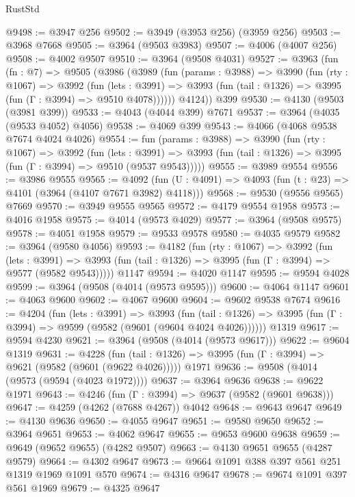 \begin{lexlean}{RustStd}
\begin{coremodule}
@9498 := @3947 @256
@9502 := @3949 (@3953 @256) (@3959 @256)
@9503 := @3968 @7668
@9505 := @3964 (@9503 @3983)
@9507 := @4006 (@4007 @256)
@9508 := @4002 @9507
@9510 := @3964 (@9508 @4031)
@9527 := @3963
    (fun (fn : @7) =>
    @9505
      (@3986
        (@3989
          (fun (params : @3988) =>
          @3990
            (fun (rty : @1067) =>
            @3992
              (fun (lets : @3991) =>
              @3993 (fun (tail : @1326) => @3995 (fun (Γ : @3994) => @9510 @4078))))))
        @4124))
    @399
@9530 := @4130 (@9503 (@3981 @399))
@9533 := @4043 (@4044 @399) @7671
@9537 := @3964 (@4035 (@9533 @4052) @4056)
@9538 := @4069 @399
@9543 := @4066 (@4068 @9538 @7674 @4024 @4026)
@9554 := fun (params : @3988) =>
  @3990
    (fun (rty : @1067) =>
    @3992
      (fun (lets : @3991) =>
      @3993 (fun (tail : @1326) => @3995 (fun (Γ : @3994) => @9510 (@9537 @9543)))))
@9555 := @3989 @9554
@9556 := @3986 @9555
@9565 := @4092 (fun (U : @4091) => @4093 (fun (t : @23) => @4101 (@3964 (@4107 @7671 @3982) @4118)))
@9568 := @9530 (@9556 @9565) @7669
@9570 := @3949 @9555 @9565
@9572 := @4179 @9554 @1958
@9573 := @4016 @1958
@9575 := @4014 (@9573 @4029)
@9577 := @3964 (@9508 @9575)
@9578 := @4051 @1958
@9579 := @9533 @9578
@9580 := @4035 @9579
@9582 := @3964 (@9580 @4056)
@9593 := @4182
    (fun (rty : @1067) =>
    @3992
      (fun (lets : @3991) =>
      @3993 (fun (tail : @1326) => @3995 (fun (Γ : @3994) => @9577 (@9582 @9543)))))
    @1147
@9594 := @4020 @1147
@9595 := @9594 @4028
@9599 := @3964 (@9508 (@4014 (@9573 @9595)))
@9600 := @4064 @1147
@9601 := @4063 @9600
@9602 := @4067 @9600
@9604 := @9602 @9538 @7674
@9616 := @4204
    (fun (lets : @3991) =>
    @3993
      (fun (tail : @1326) => @3995 (fun (Γ : @3994) => @9599 (@9582 (@9601 (@9604 @4024 @4026))))))
    @1319
@9617 := @9594 @4230
@9621 := @3964 (@9508 (@4014 (@9573 @9617)))
@9622 := @9604 @1319
@9631 := @4228
    (fun (tail : @1326) => @3995 (fun (Γ : @3994) => @9621 (@9582 (@9601 (@9622 @4026)))))
    @1971
@9636 := @9508 (@4014 (@9573 (@9594 (@4023 @1972))))
@9637 := @3964 @9636
@9638 := @9622 @1971
@9643 := @4246 (fun (Γ : @3994) => @9637 (@9582 (@9601 @9638)))
@9647 := @4259 (@4262 (@7688 @4267)) @4042
@9648 := @9643 @9647
@9649 := @4130 @9636
@9650 := @4055 @9647
@9651 := @9580 @9650
@9652 := @3964 @9651
@9653 := @4062 @9647
@9655 := @9653 @9600 @9638
@9659 := @9649 (@9652 @9655) (@4282 @9507)
@9663 := @4130 @9651 @9655 (@4287 @9579)
@9664 := @4302 @9647
@9673 := @9664 @1091 @388 @397 @561 @251 @1319 @1969 @1091 @570
@9674 := @4316 @9647
@9678 := @9674 @1091 @397 @561 @1969
@9679 := @4325 @9647

\end{coremodule}
\end{lexlean}
